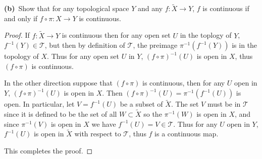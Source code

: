 \documentclass[11pt]{amsart}
\theoremstyle{definition}
\numberwithin{theorem}{section}
\numberwithin{definition}{section}
\numberwithin{equation}{section}
\def\scriptt{{\mathcal T}}
\begin{document}
{\bf (b)}\ 
Show that for any topological space $Y$ and any $f:\tilde X\to Y$,
$f$ is continuous if and only if $f\circ\pi:X\to Y$ is continuous.
\begin{proof}
	If $f: \tilde X \to Y$ is continuous then for any open set $U$ in the toplogy of $Y$, $f^{-1}(Y) \in \scriptt$, but then
	by definition of $\scriptt$, the preimage $\pi^{-1}(f^{-1}(Y))$ is in the topology of $X$. Thus for any open set $U$ in $Y$, $(f \circ \pi)^{-1}(U)$ is open in $X$, thus $(f \circ \pi)$ is continuous.

	In the other direction suppose that $(f \circ \pi)$ is continuous, then for any $U$ open in $Y$, $(f \circ \pi)^{-1}(U)$ is
	open in $X$. Then $(f \circ \pi)^{-1}(U) = \pi^{-1}(f^{-1}(U))$ is open. In particular, let $V = f^{-1}(U)$ be a subset of $\tilde X$. The set $V$ must be in $\scriptt$ since it is defined to be the set of all $W \subset \tilde X$ so the $\pi^{-1}(W)$ is open in $X$, and since $\pi^{-1}(V)$ is open in $X$ we have $f^{-1}(U) = V \in \scriptt$. Thus for any $U$ open in $Y$, $f^{-1}(U)$ is open in $\tilde X$ with respect to $\scriptt$, thus $f$ is a continuous map.

	This completes the proof.
\end{proof}
\end{document}
